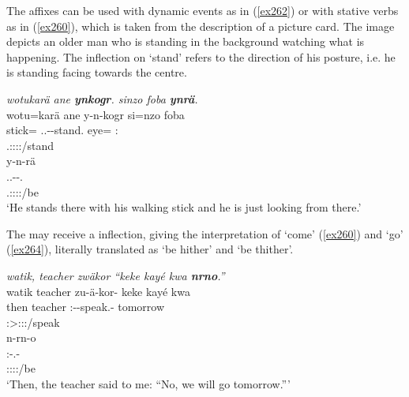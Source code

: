 The  affixes can be used with dynamic events as in (\ref{ex262}) or with stative verbs as in (\ref{ex260}), which is taken from the description of a picture card. The image depicts an older man who is standing in the background watching what is happening. The  inflection on `stand' refers to the direction of his posture, i.e. he is standing facing towards the  centre.

\begin{exe}
	\ex \emph{wotukarä ane \textbf{ynkogr}. sinzo foba \textbf{ynrä}.}\\
	\glll wotu=karä ane y-n-kogr si=nzo foba\\
	stick=\Prop{} \Dem{} \Tsg.\Masc.\Alph-\Venit-stand.\Ndu{} eye=\Only{} \Dist:\Abl{}\\
	{} {} \footnotesize{\Tsg.\Masc:\Sbj:\Nonpast:\Ipfv:\Venit/stand} {} {}\\
	\sn
	\glll y-n-rä\\
	\Tsg.\Masc.\Alph-\Venit-\Cop.\Ndu\\
	\footnotesize{\Tsg.\Masc:\Sbj:\Nonpast:\Ipfv:\Venit/be}\\
	\trans `He stands there with his walking stick and he is just looking from there.'\\ 
	\label{ex260}
\end{exe}

The  may receive a  inflection, giving the interpretation of `come' (\ref{ex260}) and `go' (\ref{ex264}), literally translated as `be hither' and `be thither'.

\begin{exe}
	\ex \emph{watik, teacher zwäkor ``keke kayé kwa \textbf{nrno}.''}\\
	\glll watik teacher zu-ä-kor-\Zero{} keke kayé kwa\\
	then teacher \Fsg:\Gam-\Ndu-speak.\Rs-\Stsg{} \Neg{} tomorrow \Fut{}\\
	{} {} \footnotesize{\Stsg:\Sbj>\Fsg:\Obj:\Rpst:\Pfv/speak} {} {} {}\\
	\sn
	\glll n-rn-o\\
	\Fnsg:\Alph-\Cop.\Du-\Andat{}\\
	\footnotesize{\Fdu:\Sbj:\Nonpast:\Ipfv:\Andat/be}\\
	\trans `Then, the teacher said to me: ``No, we will go tomorrow.'''\\ 
	\label{ex264}
\end{exe}

